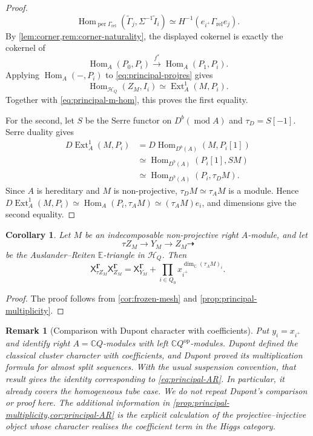\documentclass[11pt,reqno]{article}
\numberwithin{equation}{section}
\newtheorem{corollary}[corollary]{Corollary}
\newtheorem{remark}[remark]{Remark}
\theoremstyle{definition}
\DeclareMathOperator{\Hom}{Hom}
\DeclareMathOperator{\Ext}{Ext}
\DeclareMathOperator{\modu}{mod}
\newcommand{\E}{\mathbb E}
\newcommand{\X}{\mathsf X}
\newcommand{\kk}{\mathbb C}
\begin{document}
\begin{proof}
\[
 \Hom_{\operatorname{per}\Gamma_{\mathrm{rel}}}(\widetilde\Gamma_j,\Sigma^{-1}\widetilde I_i)
 \simeq H^{-1}(e_{i^+}\Gamma_{\mathrm{rel}}e_j).
\]
By \cref{lem:corner,rem:corner-naturality}, the displayed cokernel is exactly the cokernel of
\[
 \Hom_A(P_0,P_i)\xrightarrow{f^*}\Hom_A(P_1,P_i).
\]
Applying $\Hom_A(-,P_i)$ to \eqref{eq:principal-projres} gives
\[
 \Hom_{\mathcal H_Q}(Z_M,I_i)\simeq\Ext_A^1(M,P_i).
\]
Together with \eqref{eq:principal-m-hom}, this proves the first equality.

For the second, let $S$ be the Serre functor on $D^b(\modu A)$ and $\tau_D=S[-1]$.  Serre duality gives
\[
\begin{aligned}
 D\Ext_A^1(M,P_i)
 &=D\Hom_{D^b(A)}(M,P_i[1])\\
 &\simeq\Hom_{D^b(A)}(P_i[1],SM)\\
 &\simeq\Hom_{D^b(A)}(P_i,\tau_D M).
\end{aligned}
\]
Since $A$ is hereditary and $M$ is non-projective, $\tau_D M\simeq\tau_A M$ is a module.  Hence $D\Ext_A^1(M,P_i)\simeq\Hom_A(P_i,\tau_A M)\simeq(\tau_A M)e_i$, and dimensions give the second equality.
\end{proof}

\begin{corollary}\label{cor:principal-AR}
Let $M$ be an indecomposable non-projective right $A$-module, and let
\[
 \tau Z_M\longrightarrow Y_M\longrightarrow Z_M\dashrightarrow
\]
be the Auslander--Reiten $\E$-triangle in $\mathcal H_Q$.  Then
\begin{equation}\label{eq:principal-AR}
 \X^{\boldsymbol\Gamma}_{\tau Z_M}\X^{\boldsymbol\Gamma}_{Z_M}
 =\X^{\boldsymbol\Gamma}_{Y_M}
  +\prod_{i\in Q_0}x_{i^+}^{\dim_{\kk}(\tau_A M)_i}.
\end{equation}
\end{corollary}

\begin{proof}
 The proof follows from \cref{cor:frozen-mesh} and \cref{prop:principal-multiplicity}.
\end{proof}

\begin{remark}[Comparison with Dupont character with coefficients]\label{rem:dupont-comparison}
Put $y_i=x_{i^+}$ and identify right $A=\kk Q$-modules with left $\kk Q^{\mathrm{op}}$-modules. Dupont \cite[Definition~2.1]{DupontCoefficients} defined the classical cluster character with coefficients, and Dupont \cite[Proposition~2.2]{DupontCoefficients} proved its multiplication formula for almost split sequences. With the usual suspension convention, that result gives the  identity corresponding to \eqref{eq:principal-AR}. In particular, it already covers the homogeneous tube case. We do not repeat Dupont's comparison or proof here. The additional information in \cref{prop:principal-multiplicity,cor:principal-AR} is the explicit calculation of the projective--injective object whose character realises the coefficient term in the Higgs category.
\end{remark}
\end{document}
